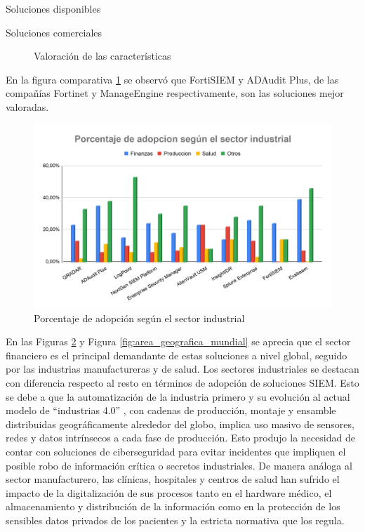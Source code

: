 \begin{section}{Soluciones disponibles}
\begin{subsection}{Soluciones comerciales}
\begin{figure}
            \caption{Valoración de las características}
            \label{fig:tabla_valoracion}
        \end{figure}
        \FloatBarrier
        En la figura comparativa \ref{fig:tabla_valoracion} se observó que FortiSIEM y ADAudit Plus, de las compañías Fortinet\cite{fortisiem} y ManageEngine\cite{adaudit} respectivamente, son las soluciones mejor valoradas.
        \begin{figure}[H]
            \centering
            \includegraphics[width=1\textwidth]{./marco_teorico_imagenes/figura_10_porcentaje_sector_ind.png}
            \caption{Porcentaje de adopción según el sector industrial}
            \label{fig:sector_industrial}
        \end{figure}
        \FloatBarrier
       \vspace{-0,5cm}
        En las Figuras \ref{fig:sector_industrial} y Figura \ref{fig:area_geografica_mundial} se aprecia que el sector financiero es el principal demandante de estas soluciones a nivel global, seguido por las industrias manufactureras y de salud. Los sectores industriales se destacan con diferencia respecto al resto en términos de adopción de soluciones SIEM. Esto se debe a que la automatización de la industria primero y su evolución al actual modelo de “industrias 4.0” \cite{industrias_4}, con cadenas de producción, montaje y ensamble distribuidas geográficamente alrededor del globo, implica uso masivo de sensores, redes y datos intrínsecos a cada fase de producción. Esto produjo la necesidad de contar con soluciones de ciberseguridad para evitar incidentes que impliquen el posible robo de información crítica o secretos industriales. De manera análoga al sector manufacturero, las clínicas, hospitales \cite{CCN_CERT} y centros de salud han sufrido el impacto de la digitalización de sus procesos tanto en el hardware médico, el almacenamiento y distribución de la información como en la protección de los sensibles datos privados de los pacientes y la estricta normativa que los regula. \par

\end{subsection}
\end{section}
